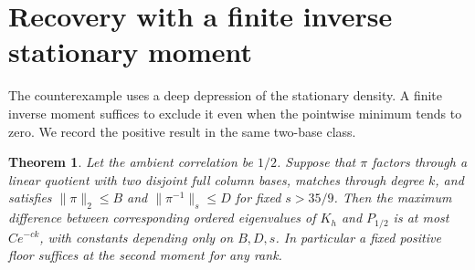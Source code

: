 \documentclass[11pt]{article}
\newtheorem{theorem}{Theorem}
\begin{document}
\section{Recovery with a finite inverse stationary moment}
The counterexample uses a deep depression of the stationary density. A finite inverse moment suffices to exclude it even when the pointwise minimum tends to zero. We record the positive result in the same two-base class.

\begin{theorem}\label{inverse}
Let the ambient correlation be $1/2$. Suppose that $\pi$ factors through a linear quotient with two disjoint full column bases, matches through degree $k$, and satisfies $\|\pi\|_2\le B$ and $\|\pi^{-1}\|_s\le D$ for fixed $s>35/9$. Then the maximum difference between corresponding ordered eigenvalues of $K_h$ and $P_{1/2}$ is at most $C e^{-ck}$, with constants depending only on $B,D,s$. In particular a fixed positive floor suffices at the second moment for any rank.
\end{theorem}
\end{document}
